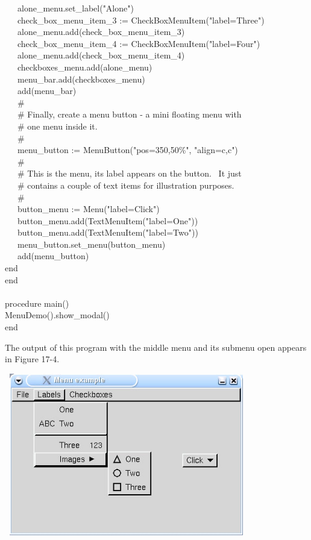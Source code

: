 {\>   \ \ \ alone\_menu.set\_label("Alone") \\
\>   \ \ \ check\_box\_menu\_item\_3 :=
CheckBoxMenuItem("label=Three") \\
\>   \ \ \ alone\_menu.add(check\_box\_menu\_item\_3) \\
\>   \ \ \ check\_box\_menu\_item\_4 :=
CheckBoxMenuItem("label=Four") \\
\>   \ \ \ alone\_menu.add(check\_box\_menu\_item\_4) \\
\>   \ \ \ checkboxes\_menu.add(alone\_menu) \\
\>   \ \ \ menu\_bar.add(checkboxes\_menu) \\
\>   \ \ \ add(menu\_bar) \\
\>   \ \ \ \# \\
\>   \ \ \ \# Finally, create a menu button - a mini floating menu with \\
\>   \ \ \ \# one menu inside it. \\
\>   \ \ \ \# \\
\>   \ \ \ menu\_button :=
MenuButton("pos=350,50\%",
"align=c,c") \\
\>   \ \ \ \# \\
\>   \ \ \ \# This is the menu, its label appears on the button. \ It just\\
\>   \ \ \ \# contains a couple of text items for illustration purposes. \\
\>   \ \ \ \# \\
\>   \ \ \ button\_menu :=
Menu("label=Click") \\
\>   \ \ \ button\_menu.add(TextMenuItem("label=One")) \\
\>   \ \ \ button\_menu.add(TextMenuItem("label=Two")) \\
\>   \ \ \ menu\_button.set\_menu(button\_menu) \\
\>   \ \ \ add(menu\_button) \\
\>   end \\
end \\
\ \\
procedure main() \\
\>   MenuDemo().show\_modal() \\
end
}

The output of this program with the middle menu and its submenu open
appears in Figure 17-4.\\

\begin{center}
\includegraphics[width=4.2043in,height=2.7925in]{ub-img/ub-img53.jpg}
\end{center}

